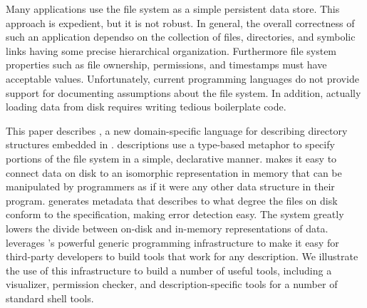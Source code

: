 Many applications use the file system as a simple persistent data
store.  This approach is expedient, but it is not robust.  In general,
the overall correctness of such an application dependso on the
collection of files, directories, and symbolic links having some
precise hierarchical organization. Furthermore file system properties
such as file ownership, permissions, and timestamps must have
acceptable values. Unfortunately, current programming languages do not
provide support for documenting assumptions about the file system. In
addition, actually loading data from disk requires writing tedious
boilerplate code.

This paper describes \forest{}, a new domain-specific language for
describing directory structures embedded in \haskell{}. \forest{}
descriptions use a type-based metaphor to specify portions of the file
system in a simple, declarative manner.  \forest{} makes it easy to
connect data on disk to an isomorphic representation in memory
that can be manipulated by programmers as if it were any other
data structure in their program.  \forest{} generates
metadata that describes to what degree the files on disk conform to
the specification, making error detection easy. The system greatly
lowers the divide between on-disk and in-memory representations of
data. \forest{} leverages \haskell{}'s powerful generic programming
infrastructure to make it easy for third-party developers to build
tools that work for any \forest{} description.  We illustrate the use
of this infrastructure to build a number of useful tools, including a
visualizer, permission checker, and description-specific tools for a
number of standard shell tools.

